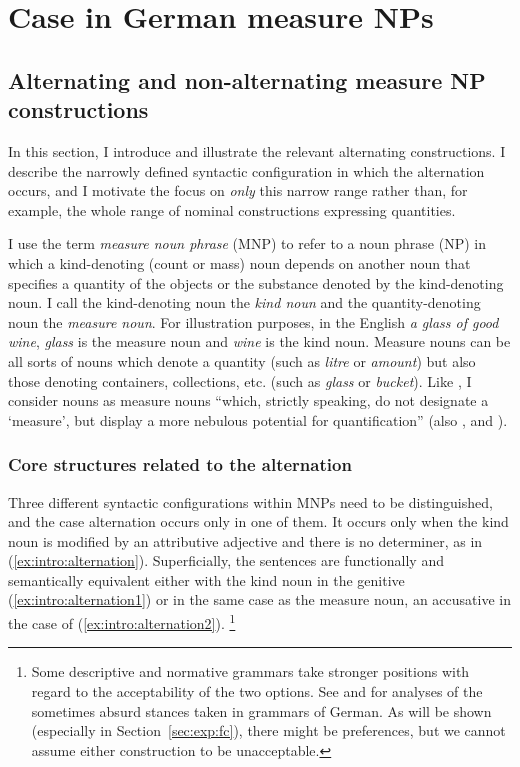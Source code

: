 \section{Case in German measure NPs}
\label{sec:germanmeasurenps}

\subsection{Alternating and non-alternating measure NP constructions}
\label{sec:descriptive}

In this section, I introduce and illustrate the relevant alternating constructions.
I describe the narrowly defined syntactic configuration in which the alternation occurs, and I motivate the focus on \textit{only} this narrow range rather than, for example, the whole range of nominal constructions expressing quantities.

I use the term \textit{measure noun phrase} (MNP) to refer to a noun phrase (NP) in which a kind-denoting (count or mass) noun depends on another noun that specifies a quantity of the objects or the substance denoted by the kind-denoting noun.
I call the kind-denoting noun the \textit{kind noun} and the quantity-denoting noun the \textit{measure noun}.
For illustration purposes, in the English \textit{a glass of good wine}, \textit{glass} is the measure noun and \textit{wine} is the kind noun.
Measure nouns can be all sorts of nouns which denote a quantity (such as \textit{litre} or \textit{amount}) but also those denoting containers, collections, etc. (such as \textit{glass} or \textit{bucket}).
Like \citet[284]{Brems2003}, I consider nouns as measure nouns ``which, strictly speaking, do not designate a `measure', but display a more nebulous potential for quantification'' (also \citealp[530]{Koptjevskaja2001}, and \citealp[338]{Rutkowski2007}).

\subsubsection{Core structures related to the alternation}

Three different syntactic configurations within MNPs need to be distinguished, and the case alternation occurs only in one of them.
It occurs only when the kind noun is modified by an attributive adjective and there is no determiner, as in (\ref{ex:intro:alternation}).
Superficially, the sentences are functionally and semantically equivalent either with the kind noun in the genitive (\ref{ex:intro:alternation1}) or in the same case as the measure noun, an accusative in the case of (\ref{ex:intro:alternation2}).%
\footnote{Some descriptive and normative grammars take stronger positions with regard to the acceptability of the two options.
See \cite{Hentschel1993} and \cite{Zimmer2015} for analyses of the sometimes absurd stances taken in grammars of German.
As will be shown (especially in Section~\ref{sec:exp:fc}), there might be preferences, but we cannot assume either construction to be unacceptable.
}

